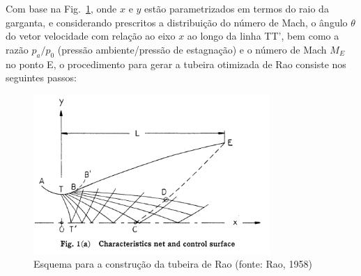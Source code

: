 \documentclass[12pt,a4paper]{article}
\begin{document}
	Com base na Fig.~\ref{fig:nozzle}, onde $x$ e $y$ estão parametrizados em termos do raio da garganta, e considerando prescritos a distribuição do número de Mach, o ângulo $\theta$ do vetor velocidade com relação ao eixo $x$ ao longo da linha TT', bem como a razão $p_a/p_0$ (pressão ambiente/pressão de estagnação) e o número de Mach $M_E$ no ponto E, o procedimento para gerar a tubeira otimizada de Rao consiste nos seguintes passos: 
\begin{figure}[!ht]
\centering
\includegraphics[width=0.8\textwidth]{./fig/nozzle}
\caption{Esquema para a construção da tubeira de Rao (fonte: Rao, 1958)}
\label{fig:nozzle}
\end{figure}
\end{document}
